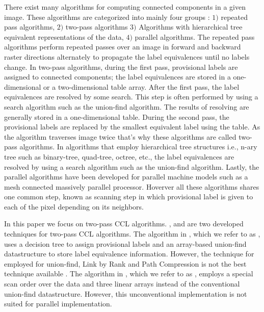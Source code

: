 There exist many algorithms for computing connected components in a given image. These algorithms are categorized into
mainly four groups %
\cite{Suzuki2003_Linear}
: $1)$ repeated pass algorithms, $2)$ two-pass algorithms $3)$ Algorithms with hierarchical tree equivalent representations 
of the data, $4)$ parallel algorithms.
The repeated pass algorithms perform repeated passes over an image in forward and backward raster directions alternately
to propagate the label equivalences until no labels change.
In two-pass algorithms, during the first pass, provisional labels are assigned to connected components;
the label equivalences are stored in a one-dimensional or a two-dimensional table array. After the first pass, the label 
equivalences are resolved by some search. This step is often performed by using
a search algorithm such as the union-find algorithm.
The results of resolving are generally stored in a one-dimensional table. During the second pass, the provisional labels are 
replaced by the smallest equivalent label using the table. As the algorithm traverses image twice that's why these algorithms 
are called two-pass algorithms.
In algorithms that employ hierarchical tree structures i.e., n-ary tree such as binary-tree, quad-tree, octree, etc., the
label equivalences are resolved by using a search algorithm such as the union-find algorithm.
Lastly, the parallel algorithms have been developed for parallel machine models such as a mesh connected massively parallel processor.
Hoverver all these algorithms shares one common step, known as scanning step in which provisional label is given to each of the
pixel depending on its neighbors.

In this paper we focus on two-pass CCL algorithms. \cite{Wu2009_LRPC}, and \cite{He2012_ARun} are two
developed techniques for two-pass CCL algorithms.
The algorithm in \cite{Wu2009_LRPC}, which we refer to as \lrpc, uses a decision tree to assign provisional labels and an array-based union-find datastructure
to store label equivalence information. However, the technique for employed for union-find, Link by Rank and Path Compression is
not the best technique available \cite{Patwary2012_PARemSP}. 
The algorithm in \cite{He2012_ARun}, which we refer to as \arun, employs a special scan order over the data and three linear
arrays instead of the conventional union-find datastructure. However, this unconventional implementation is not suited for parallel implementation.

